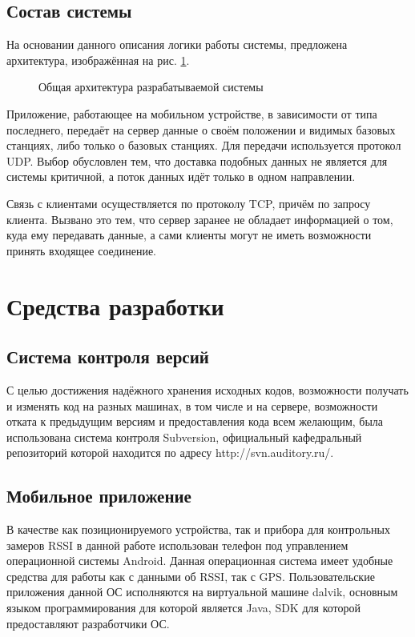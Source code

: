 \subsection{Состав системы}
На основании данного описания логики работы системы, предложена архитектура, изображённая на рис. \ref{fig:general-arch}.

\begin{figure}[h]
	\caption{Общая архитектура разрабатываемой системы}
	\label{fig:general-arch}
\end{figure}

Приложение, работающее на мобильном устройстве, в зависимости от типа последнего, передаёт на сервер данные о своём положении и видимых базовых станциях, либо только о базовых станциях. Для передачи используется протокол UDP. Выбор обусловлен тем, что доставка подобных данных не является для системы критичной, а поток данных идёт только в одном направлении.

Связь с клиентами осуществляется по протоколу TCP, причём по запросу клиента. Вызвано это тем, что сервер заранее не обладает информацией о том, куда ему передавать данные, а сами клиенты могут не иметь возможности принять входящее соединение.

\section{Средства разработки}

\subsection{Система контроля версий}
С целью достижения надёжного хранения исходных кодов, возможности получать и изменять код на разных машинах, в том числе и на сервере, возможности отката к предыдущим версиям и предоставления кода всем желающим, была использована система контроля Subversion, официальный кафедральный репозиторий которой находится по адресу http://svn.auditory.ru/.

\subsection{Мобильное приложение}
В качестве как позиционируемого устройства, так и прибора для контрольных замеров RSSI в данной работе использован телефон под управлением операционной системы Android. Данная операционная система имеет удобные средства для работы как с данными об RSSI\cite{androidnecelinf}, так с GPS\cite{androidlocman}. Пользовательские приложения данной ОС исполняются на виртуальной машине dalvik\cite{enwikidalvik}, основным языком программирования для которой является Java, SDK для которой предоставляют разработчики ОС\cite{androidsdk}.

